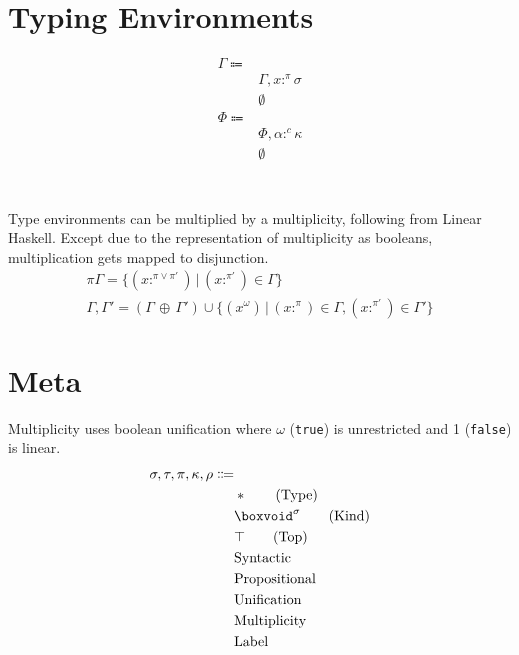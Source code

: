 \documentclass {article}
\begin{document}
\section{Typing Environments}
\begin{align*}
\Gamma \Coloneqq & \\
& \Gamma, x :^\pi \sigma \\
& \emptyset \\
\Phi \Coloneqq & \\
& \Phi, \alpha :^c \kappa \\
& \emptyset \\
\end{align*} \\
\\
Type environments can be multiplied by a multiplicity, following from Linear Haskell.
Except due to the representation of multiplicity as booleans, multiplication gets mapped to disjunction.
\begin{gather*}
\pi \Gamma = \{(x :^{\pi \lor  \pi'}) \, | \, (x :^{\pi'}) \in \Gamma \} \\
\Gamma, \Gamma' = (\Gamma \, \oplus \, \Gamma') \cup \{ (x^\omega) \, | \, (x :^\pi) \in \Gamma, (x :^{\pi'}) \in \Gamma' \}
\end{gather*}

\section{Meta}
Multiplicity uses boolean unification where $ \omega $ (\texttt{true}) is unrestricted and 1 (\texttt{false}) is linear.
\begin{align*}
\sigma, \tau, \pi, \kappa, \rho \Coloneqq & \\
& * \tag{Type} \\
& \boxvoid^\sigma \tag{Kind} \\
& \top \tag{Top} \\
& \text{Syntactic} \\
& \text{Propositional} \\
& \text{Unification} \\
& \text{Multiplicity} \\
& \text{Label}
\end{align*}
\end{document}
